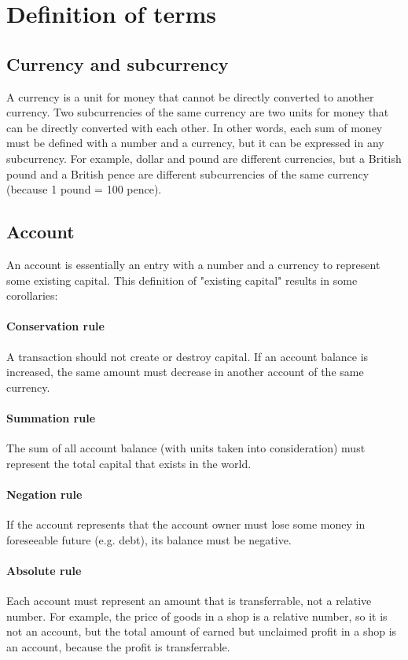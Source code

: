 \documentclass{report}
\begin{document}
		\section{Definition of terms}
			\subsection{Currency and subcurrency}
				A currency is a unit for money that cannot be directly converted to another currency.
				Two subcurrencies of the same currency are two units for money that can be directly converted with each other.
				In other words, each sum of money must be defined with a number and a currency, but it can be expressed in any subcurrency.
				For example, dollar and pound are different currencies, but a British pound and a British pence are different subcurrencies of the same currency
				(because 1 pound = 100 pence).

			\subsection{Account}
				An account is essentially an entry with a number and a currency to represent some existing capital.
				This definition of "existing capital" results in some corollaries:
				\paragraph{Conservation rule} A transaction should not create or destroy capital.
					If an account balance is increased, the same amount must decrease in another account of the same currency.
				\paragraph{Summation rule} The sum of all account balance (with units taken into consideration) must represent the total capital that exists in the world.
				\paragraph{Negation rule} If the account represents that the account owner must lose some money in foreseeable future (e.g. debt), its balance must be negative.
				\paragraph{Absolute rule} Each account must represent an amount that is transferrable, not a relative number.
					For example, the price of goods in a shop is a relative number, so it is not an account,
					but the total amount of earned but unclaimed profit in a shop is an account, because the profit is transferrable.
\end{document}
